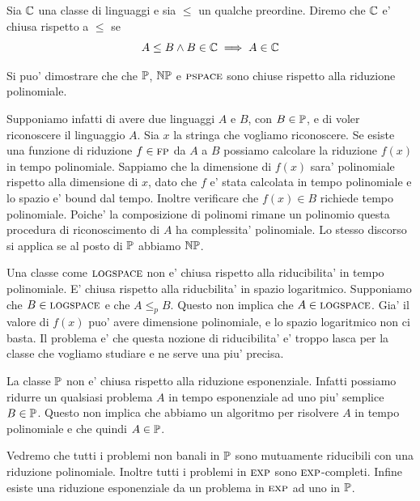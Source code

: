
\begin{defn}
    Sia $\mathbb{C}$ una classe di linguaggi e sia $\leq$ un qualche preordine. Diremo che $\mathbb{C}$ e'
    chiusa rispetto a $\leq$ se
    \begin{equation*}
        A \leq B \land B \in \mathbb{C} \implies A \in \mathbb{C}
    \end{equation*}
\end{defn}

Si puo' dimostrare che che $\mathbb{P}$, $\mathbb{NP}$ e $\textsc{pspace}$ sono chiuse rispetto alla riduzione
polinomiale.

Supponiamo infatti di avere due linguaggi $A$ e $B$, con $B \in \mathbb{P}$, e di voler riconoscere il
linguaggio $A$. Sia $x$ la stringa che vogliamo riconoscere. Se esiste una funzione di riduzione $f
\in \textsc{fp}$ da $A$ a $B$ possiamo calcolare la riduzione $f(x)$ in tempo polinomiale.  Sappiamo che la
dimensione di $f(x)$ sara' polinomiale rispetto alla dimensione di $x$, dato che $f$ e' stata
calcolata in tempo polinomiale e lo spazio e' bound dal tempo. Inoltre verificare che $f(x) \in B$
richiede tempo polinomiale. Poiche' la composizione di polinomi rimane un polinomio questa procedura
di riconoscimento di $A$ ha complessita' polinomiale. Lo stesso discorso si applica se al posto di
$\mathbb{P}$ abbiamo $\mathbb{NP}$.

Una classe come $\textsc{logspace}$ non e' chiusa rispetto alla riducibilita' in tempo polinomiale. E'
chiusa rispetto alla riducbilita' in spazio logaritmico. Supponiamo che $B \in \textsc{logspace}$ e che $A
\leq_{p} B$. Questo non implica che $A \in \textsc{logspace}$. Gia' il valore di $f(x)$ puo' avere
dimensione polinomiale, e lo spazio logaritmico non ci basta. Il problema e' che questa nozione di
riducibilita' e' troppo lasca per la classe che vogliamo studiare e ne serve una piu' precisa.

La classe $\mathbb{P}$ non e' chiusa rispetto alla riduzione esponenziale. Infatti possiamo ridurre un
qualsiasi problema $A$ in tempo esponenziale ad uno piu' semplice $B \in \mathbb{P}$. Questo non
implica che abbiamo un algoritmo per risolvere $A$ in tempo polinomiale e che quindi $A \in
\mathbb{P}$.

Vedremo che tutti i problemi non banali in $\mathbb{P}$ sono mutuamente riducibili con una riduzione
polinomiale. Inoltre tutti i problemi in $\textsc{exp}$ sono $\textsc{exp}$-completi. Infine esiste una riduzione
esponenziale da un problema in $\textsc{exp}$ ad uno in $\mathbb{P}$.


